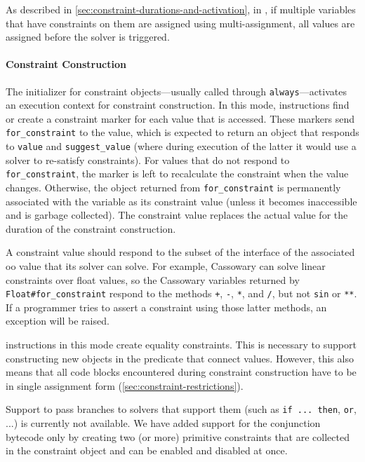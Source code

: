 As described in \autoref{sec:constraint-durations-and-activation}, in
\toolname, if multiple variables that have constraints on them are
assigned using multi-assignment, all values are assigned before the
solver is triggered.

\paragraph{Constraint Construction}
The initializer for constraint objects---usually called through
\lstinline{always}---activates an execution context for constraint
construction. In this mode, \load instructions find or create a
constraint marker for each value that is accessed. These markers send
\lstinline{for_constraint} to the value, which is expected to return
an object that responds to \lstinline{value} and
\lstinline{suggest_value} (where during execution of the latter it
would use a solver to re-satisfy constraints). For values that do not
respond to \lstinline{for_constraint}, the marker is left to
recalculate the constraint when the value changes. Otherwise, the
object returned from \lstinline{for_constraint} is permanently
associated with the variable as its constraint value (unless it
becomes inaccessible and is garbage collected). The constraint
value replaces the actual value for the duration of the constraint
construction.

A constraint value should respond to the subset of the interface of
the associated \ac{oo} value that its solver can solve. For example,
Cassowary can solve linear constraints over float values, so the
Cassowary variables returned by \lstinline{Float#for_constraint}
respond to the methods \lstinline{+}, \lstinline{-}, \lstinline{*},
and \lstinline{/}, but not \lstinline{sin} or \lstinline{**}. If a
programmer tries to assert a constraint using those latter methods, an
exception will be raised.

\store instructions in this mode create equality constraints. This is
necessary to support constructing new objects in the predicate that
connect values. However, this also means that all code blocks
encountered during constraint construction have to be in single
assignment form (\autoref{sec:constraint-restrictions}).

Support to pass branches to solvers that support them (such as
\lstinline{if ... then}, \lstinline{or}, ...) is currently not
available. We have added support for the conjunction bytecode only by
creating two (or more) primitive constraints that are collected in the
constraint object and can be enabled and disabled at once.

